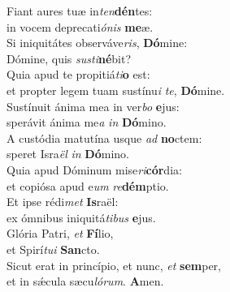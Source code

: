 \evenverse Fiant aures tuæ in\textit{ten}\textbf{dén}tes:~\*\\
\evenverse in vocem deprecati\textit{ó}\textit{nis} \textbf{me}æ.\\
\oddverse Si iniquitátes observáve\textit{ris}, \textbf{Dó}mine:~\*\\
\oddverse Dómine, quis \textit{su}\textit{sti}\textbf{né}bit?\\
\evenverse Quia apud te propitiá\textit{ti}\textbf{o} est:~\*\\
\evenverse et propter legem tuam sustínu\textit{i} \textit{te}, \textbf{Dó}mine.\\
\oddverse Sustínuit ánima mea in ver\textit{bo} \textbf{e}jus:~\*\\
\oddverse sperávit ánima me\textit{a} \textit{in} \textbf{Dó}mino.\\
\evenverse A custódia matutína usque \textit{ad} \textbf{no}ctem:~\*\\
\evenverse speret Isra\textit{ël} \textit{in} \textbf{Dó}mino.\\
\oddverse Quia apud Dóminum mise\textit{ri}\textbf{cór}dia:~\*\\
\oddverse et copiósa apud e\textit{um} \textit{re}\textbf{dém}ptio.\\
\evenverse Et ipse rédi\textit{met} \textbf{Is}raël:~\*\\
\evenverse ex ómnibus iniquitá\textit{ti}\textit{bus} \textbf{e}jus.\\
\oddverse Glória Patri, \textit{et} \textbf{Fí}lio,~\*\\
\oddverse et Spirí\textit{tu}\textit{i} \textbf{San}cto.\\
\evenverse Sicut erat in princípio, et nunc, \textit{et} \textbf{sem}per,~\*\\
\evenverse et in sǽcula sæcu\textit{ló}\textit{rum}. \textbf{A}men.\\
